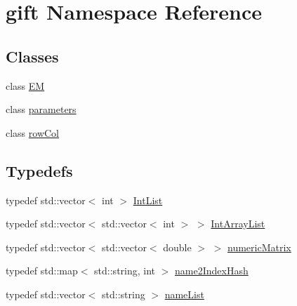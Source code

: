 \hypertarget{namespacegift}{}\section{gift Namespace Reference}
\label{namespacegift}
\subsection*{Classes}
\begin{DoxyCompactItemize}
\item 
class \hyperlink{classgift_1_1_e_m}{EM}
\item 
class \hyperlink{classgift_1_1parameters}{parameters}
\item 
class \hyperlink{classgift_1_1row_col}{row\+Col}
\end{DoxyCompactItemize}
\subsection*{Typedefs}
\begin{DoxyCompactItemize}
\item 
typedef std\+::vector$<$ int $>$ \hyperlink{namespacegift_a786390fe70b2e3b6d61dba1014651f03}{Int\+List}
\item 
typedef std\+::vector$<$ std\+::vector$<$ int $>$ $>$ \hyperlink{namespacegift_a98b589c33d80e413fceaf8afd8e25815}{Int\+Array\+List}
\item 
typedef std\+::vector$<$ std\+::vector$<$ double $>$ $>$ \hyperlink{namespacegift_a4e11987023733fe14bdabd0b52e78583}{numeric\+Matrix}
\item 
typedef std\+::map$<$ std\+::string, int $>$ \hyperlink{namespacegift_a88a96011620ed18b8321bc36a816773c}{name2\+Index\+Hash}
\item 
typedef std\+::vector$<$ std\+::string $>$ \hyperlink{namespacegift_a62f85efaab3bff48335863ae0670c7a7}{name\+List}
\end{DoxyCompactItemize}
